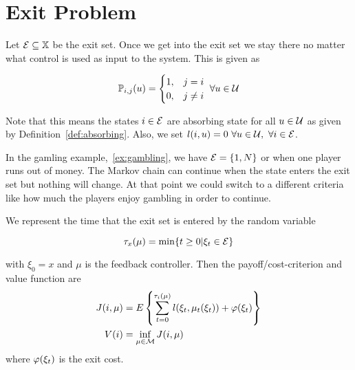 \mainmatter%
\setcounter{page}{1}

\lectureseries[\course]{\course}

\date{November 5, 2009}

\setaddress%

\setcounter{lecture}{11}
\setcounter{chapter}{11}


\section{Exit Problem}
Let $\mathcal{E}\subseteq\mathbb{X}$ be the exit set.
Once we get into the exit set we stay there no matter what control is used as input to the system.
This is given as

\begin{equation*}
\mathbb{P}_{i,j}(u) = \begin{cases} 1, & j=i \\ 0, & j\neq i \end{cases}~\forall u\in\mathcal{U}
\end{equation*}

Note that this means the states $i\in\mathcal{E}$ are absorbing state for all $u\in\mathcal{U}$ as given by Definition~\ref{def:absorbing}.
Also, we set $l(i,u)=0~\forall u\in\mathcal{U},~\forall i\in\mathcal{E}$.

In the gamling example,~\ref{ex:gambling}, we have $\mathcal{E}=\{1,N\}$ or when one player runs out of money.
The Markov chain can continue when the state enters the exit set but nothing will change.
At that point we could switch to a different criteria like how much the players enjoy gambling in order to continue.

We represent the time that the exit set is entered by the random variable

\begin{equation*}
\tau_x(\mu) = \min\{t\geq0 | \xi_t\in\mathcal{E}\}
\end{equation*}

with $\xi_0=x$ and $\mu$ is the feedback controller.
Then the payoff/cost-criterion and value function are
\begin{align*}
J(i,\mu) &= E\left\lbrace\sum_{t=0}^{\tau_i(\mu)}l(\xi_t,\mu_t(\xi_t)) + \varphi(\xi_t)\right\rbrace \\
V(i) &= \inf_{\mu\in\mathcal{M}}J(i,\mu)
\end{align*}
where $\varphi(\xi_t)$ is the exit cost.

